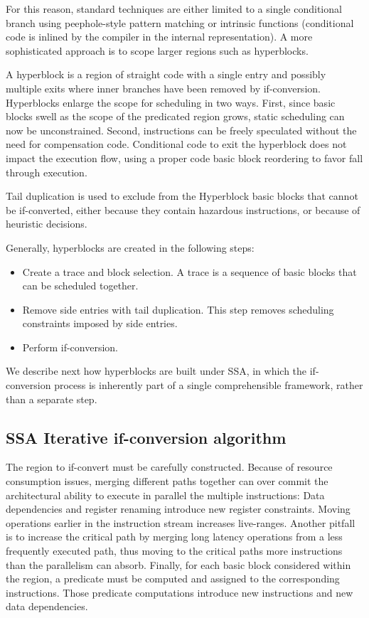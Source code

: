 For this reason, standard techniques are either limited to a single conditional branch using peephole-style pattern matching or intrinsic functions (conditional code is inlined by the compiler in the internal representation). A more sophisticated approach is to scope larger regions such as hyperblocks. 

A hyperblock is a region of straight code with a single entry and possibly multiple exits where inner branches have been removed by if-conversion.
Hyperblocks enlarge the scope for scheduling in two ways. First, since basic blocks swell as the scope of the predicated region grows, static scheduling can now be unconstrained. Second, instructions can be freely speculated without the need for compensation code. Conditional code to exit the hyperblock does not impact the execution flow, using a proper code basic block reordering to favor fall through execution.

Tail duplication is used to exclude from the Hyperblock basic blocks that cannot be if-converted, either because they contain hazardous instructions, or because of heuristic decisions. 

Generally, hyperblocks are created in the following steps:
\begin{itemize}
\item Create a trace and block selection. A trace is a sequence of basic blocks that can be scheduled together. 
\item Remove side entries with tail duplication. This step removes scheduling constraints imposed by side entries.
\item Perform if-conversion.
\end{itemize}

We describe next how hyperblocks are built under SSA, in which the if-conversion process is inherently part of a single comprehensible framework, rather than a separate step.

\subsection{SSA Iterative if-conversion algorithm}

The region to if-convert must be carefully constructed. Because of resource consumption issues, merging different paths together can over commit the architectural ability to execute in parallel the multiple instructions: Data dependencies and register renaming introduce new register constraints. Moving operations earlier in the instruction stream increases live-ranges. 
Another pitfall is to increase the critical path by merging long latency operations from a less frequently executed path, thus moving to the critical paths more instructions than the parallelism can absorb.
Finally, for each basic block considered within the region, a predicate must be computed and assigned to the corresponding instructions. Those predicate computations introduce new instructions and new data dependencies.

